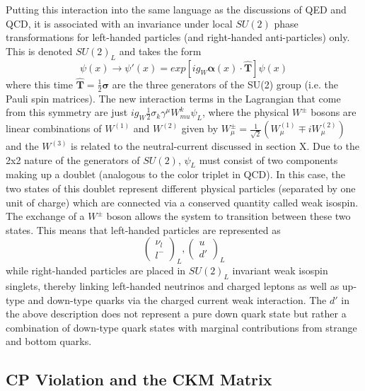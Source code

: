 Putting this interaction into the same language as the discussions of QED and QCD, it is associated with an invariance 
under local $SU(2)$ phase transformations for left-handed particles (and right-handed anti-particles) only. This is 
denoted $SU(2)_L$ and takes the form 
\begin{equation}
\psi(x) \rightarrow \psi'(x) = exp[ig_{W} \boldsymbol{\alpha}(x) \cdot \boldsymbol{\hat{T}}] \psi(x)
\end{equation}
where this time $\boldsymbol{\hat{T}} = \frac{1}{2}\boldsymbol{\sigma}$ are the three generators of the SU(2) 
group (i.e. the Pauli spin matrices). The new interaction terms in the Lagrangian that come from this symmetry are 
just $ig_W\frac{1}{2}\sigma_k\gamma^{\mu}W_{mu}^k\psi_L$, where the physical $W^{\pm}$ bosons are linear 
combinations of $W^{(1)}$ and $W^{(2)}$ given by 
$W^{\pm}_{\mu} = \frac{1}{\sqrt{2}}(W^{(1)}_{\mu} \mp iW^{(2)}_{\mu})$ and the $W^(3)$ is related to the 
neutral-current discussed in section X. Due to the 2x2 nature of the generators of $SU(2)$, $\psi_L$ must consist 
of two components making up a doublet (analogous to the color triplet in QCD). In this case, the two states of this 
doublet represent different physical particles (separated by one unit of charge) which are connected via a 
conserved quantity called weak isospin. The exchange of a $W^{\pm}$ boson allows the system to transition 
between these two states. This means that left-handed particles are represented as
\begin{equation}
\begin{pmatrix} \nu_{l} \\ l^- \end{pmatrix}_L, 
\begin{pmatrix} u \\ d' \end{pmatrix}_L
\end{equation}
while right-handed particles are placed in $SU(2)_L$ invariant weak isospin singlets, thereby linking left-handed 
neutrinos and charged leptons as well as up-type and down-type quarks via the charged current weak interaction.  
The $d'$ in the above description does not represent a pure down quark state but rather a combination of down-type 
quark states with marginal contributions from strange and bottom quarks.

\subsection{CP Violation and the CKM Matrix}

